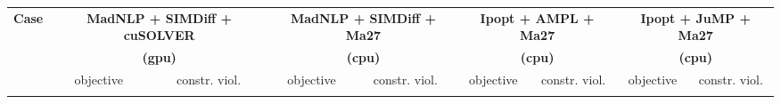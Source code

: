 \documentclass{standalone}
\begin{document}
\centering
\begin{tabular}{|l|cc|cc|cc|cc|}
  \hline
  \multirow{3}{*}{\textbf{Case}}
  & \multicolumn{2}{c|}{\textbf{MadNLP + SIMDiff + cuSOLVER}}
  & \multicolumn{2}{c|}{\textbf{MadNLP + SIMDiff + Ma27}}
  & \multicolumn{2}{c|}{\textbf{Ipopt + AMPL + Ma27}}
  & \multicolumn{2}{c|}{\textbf{Ipopt + JuMP + Ma27}}\\
  &\multicolumn{2}{c|}{\textbf{(gpu)}} &\multicolumn{2}{c|}{\textbf{(cpu)}} &\multicolumn{2}{c|}{\textbf{(cpu)}}&\multicolumn{2}{c|}{\textbf{(cpu)}}
  \\
  \cline{2-9}
  & objective & constr. viol.
  & objective & constr. viol.
  & objective & constr. viol.
  & objective & constr. viol.
  \\
  \\
  \hline
\end{tabular}
\end{document}
